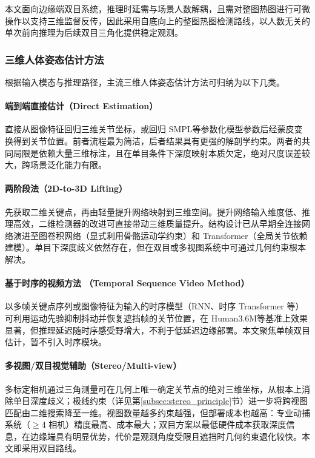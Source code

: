 本文面向边缘端双目系统，推理时延需与场景人数解耦，且需对整图热图进行可微操作以支持三维监督反传，因此采用自底向上的整图热图检测路线，以人数无关的单次前向推理为后续双目三角化提供稳定观测。

\subsubsection{三维人体姿态估计方法}
根据输入模态与推理路径，主流三维人体姿态估计方法可归纳为以下几类。

\paragraph{端到端直接估计（Direct Estimation）}
直接从图像特征回归三维关节坐标，或回归 SMPL等参数化模型参数后经蒙皮变换得到关节位置。前者流程最为简洁，后者结果具有更强的解剖学约束。两者的共同局限是依赖大量三维标注，且在单目条件下深度映射本质欠定，绝对尺度误差较大，跨场景泛化能力有限。

\paragraph{两阶段法（2D-to-3D Lifting）}
先获取二维关键点，再由轻量提升网络映射到三维空间。提升网络输入维度低、推理高效，二维检测器的改进可直接带动三维质量提升。结构设计已从早期全连接网络演进至图卷积网络（显式利用骨骼运动学约束）和 Transformer（全局关节依赖建模）。单目下深度歧义依然存在，但在双目或多视图系统中可通过几何约束根本解决。

\paragraph{基于时序的视频方法 （Temporal Sequence Video Method）}
以多帧关键点序列或图像特征为输入的时序模型（RNN、时序 Transformer 等）可利用运动先验抑制抖动并恢复遮挡帧的关节位置，在 Human3.6M等基准上效果显著，但推理延迟随时序感受野增大，不利于低延迟边缘部署。本文聚焦单帧双目估计，暂不引入时序模块。

\paragraph{多视图/双目视觉辅助（Stereo/Multi-view）}
多标定相机通过三角测量可在几何上唯一确定关节点的绝对三维坐标，从根本上消除单目深度歧义；极线约束（详见第\ref{subsec:stereo_principle}节）进一步将跨视图匹配由二维搜索降至一维。视图数量越多约束越强，但部署成本也越高：专业动捕系统（$\geq$4 相机）精度最高、成本最大；双目方案以最低硬件成本获取深度信息，在边缘端具有明显优势，代价是观测角度受限且遮挡时几何约束退化较快。本文即采用双目路线。

